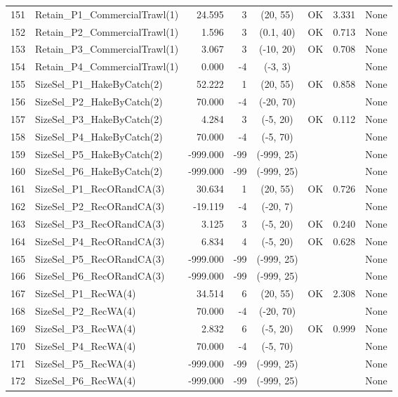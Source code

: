 \documentclass[12pt,]{article}
\begin{document}
\begin{landscape}
\begin{longtable}{rlrrcccl}
  151 & Retain\_P1\_CommercialTrawl(1) & 24.595 & 3 & (20, 55) & OK & 3.331 & None \\ 
  152 & Retain\_P2\_CommercialTrawl(1) & 1.596 & 3 & (0.1, 40) & OK & 0.713 & None \\ 
  153 & Retain\_P3\_CommercialTrawl(1) & 3.067 & 3 & (-10, 20) & OK & 0.708 & None \\ 
  154 & Retain\_P4\_CommercialTrawl(1) & 0.000 & -4 & (-3, 3) &  &  & None \\ 
  155 & SizeSel\_P1\_HakeByCatch(2) & 52.222 & 1 & (20, 55) & OK & 0.858 & None \\ 
  156 & SizeSel\_P2\_HakeByCatch(2) & 70.000 & -4 & (-20, 70) &  &  & None \\ 
  157 & SizeSel\_P3\_HakeByCatch(2) & 4.284 & 3 & (-5, 20) & OK & 0.112 & None \\ 
  158 & SizeSel\_P4\_HakeByCatch(2) & 70.000 & -4 & (-5, 70) &  &  & None \\ 
  159 & SizeSel\_P5\_HakeByCatch(2) & -999.000 & -99 & (-999, 25) &  &  & None \\ 
  160 & SizeSel\_P6\_HakeByCatch(2) & -999.000 & -99 & (-999, 25) &  &  & None \\ 
  161 & SizeSel\_P1\_RecORandCA(3) & 30.634 & 1 & (20, 55) & OK & 0.726 & None \\ 
  162 & SizeSel\_P2\_RecORandCA(3) & -19.119 & -4 & (-20, 7) &  &  & None \\ 
  163 & SizeSel\_P3\_RecORandCA(3) & 3.125 & 3 & (-5, 20) & OK & 0.240 & None \\ 
  164 & SizeSel\_P4\_RecORandCA(3) & 6.834 & 4 & (-5, 20) & OK & 0.628 & None \\ 
  165 & SizeSel\_P5\_RecORandCA(3) & -999.000 & -99 & (-999, 25) &  &  & None \\ 
  166 & SizeSel\_P6\_RecORandCA(3) & -999.000 & -99 & (-999, 25) &  &  & None \\ 
  167 & SizeSel\_P1\_RecWA(4) & 34.514 & 6 & (20, 55) & OK & 2.308 & None \\ 
  168 & SizeSel\_P2\_RecWA(4) & 70.000 & -4 & (-20, 70) &  &  & None \\ 
  169 & SizeSel\_P3\_RecWA(4) & 2.832 & 6 & (-5, 20) & OK & 0.999 & None \\ 
  170 & SizeSel\_P4\_RecWA(4) & 70.000 & -4 & (-5, 70) &  &  & None \\ 
  171 & SizeSel\_P5\_RecWA(4) & -999.000 & -99 & (-999, 25) &  &  & None \\ 
  172 & SizeSel\_P6\_RecWA(4) & -999.000 & -99 & (-999, 25) &  &  & None \\ 

\end{longtable}
\end{landscape}
\end{document}
